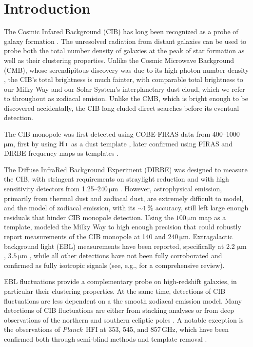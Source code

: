 \documentclass{aa}
\def\Planck{\textit{Planck}}
\newcommand{\mathsc}[1]{{\normalfont\textsc{#1}}}
\newcommand{\hi}{\ensuremath{\mathsc {H\ i}}}
\begin{document}
\section{Introduction}


The Cosmic Infared Background (CIB) has long been recognized as a probe of galaxy formation \citep{partridge1967}. The unresolved radiation from distant galaxies can be used to probe both the total number density of galaxies at the peak of star formation as well as their clustering properties. Unlike the Cosmic Microwave Background (CMB), whose serendipitous discovery was due to its high photon number density \citep{penzias:1965}, the CIB's total brightness is much fainter, with comparable total brightness to our Milky Way and our Solar System's interplanetary dust cloud, which we refer to throughout as zodiacal emision. Unlike the CMB, which is bright enough to be discovered accidentally, the CIB long eluded direct searches before its eventual detection.

The CIB monopole was first detected using COBE-FIRAS data from 400--1000\,$\mathrm{\mu m}$, first by using \hi\ as a dust template \citep{puget1996}, later confirmed using FIRAS and DIRBE frequency maps as templates \citep{fixsen1998}.

The Diffuse InfraRed Background Experiment (DIRBE) was designed to measure the CIB, with stringent requirements on straylight reduction and with high sensitivity detectors from 1.25--240\,$\mathrm{\mu m}$ \citep{boggess92,hauser1998}. However, astrophysical emission, primarily from thermal dust and zodiacal dust, are extremely difficult to model, and the \citet{kelsall1998} model of zodiacal emission, with its  $\sim1\,\%$ accuracy, still left large enough residuals that hinder CIB monopole detection. Using the $100\,\mathrm{\mu m}$ map as a template, \citet{arendt1998} modeled the Milky Way to high enough precision that \citet{hauser1998} could robustly report measurements of the CIB monopole at 140 and $240\,\mathrm{\mu m}$. Extragalactic background light (EBL) measurements have been reported, specifically at 2.2 $\mathrm{\mu m}$ \citep{wright:2000,gorjian:2000,wright:2001}, $3.5\,\mathrm{\mu m}$ \citep{dwek:1998b,gorjian:2000,wright:2000}, while all other detections have not been fully corroborated and confirmed as fully isotropic signals (see, e.g., \citealt{hauser:2001} for a comprehensive review).

EBL fluctuations provide a complementary probe on high-redshift galaxies, in particular their clustering properties. At the same time, detections of CIB fluctuations are less dependent on a the smooth zodiacal emission model. Many detections of CIB fluctuations are either from stacking analyses \citep{dole:2006} or from deep observations of the northern and southern ecliptic poles \citep{matsumoto:2011}. A notable exception is the observations of \Planck\ HFI at 353, 545, and 857\,GHz, which have been confirmed both through semi-blind methods \citep{planck2016-XLVIII,mccarthy:2024} and template removal \citep{lenz2019}.
\end{document}
